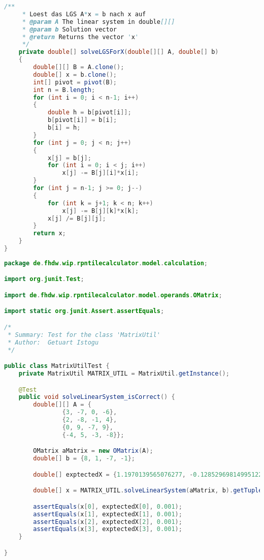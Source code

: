 \begin{lstlisting}[caption=MatrixUtil (Istogu),label=list:MatrixUtil,language=Java]
    /**
     * Loest das LGS A*x = b nach x auf
     * @param A The linear system in double[][]
     * @param b Solution vector
     * @return Returns the vector 'x'
     */
    private double[] solveLGSForX(double[][] A, double[] b)
    {
        double[][] B = A.clone();
        double[] x = b.clone();
        int[] pivot = pivot(B);
        int n = B.length;
        for (int i = 0; i < n-1; i++)
        {
            double h = b[pivot[i]];
            b[pivot[i]] = b[i];
            b[i] = h;
        }
        for (int j = 0; j < n; j++)
        {
            x[j] = b[j];
            for (int i = 0; i < j; i++)
                x[j] -= B[j][i]*x[i];
        }
        for (int j = n-1; j >= 0; j--)
        {
            for (int k = j+1; k < n; k++)
                x[j] -= B[j][k]*x[k];
            x[j] /= B[j][j];
        }
        return x;
    }
}
\end{lstlisting}    

\begin{lstlisting}[caption=MatrixUtilTest (Istogu), label=list:MatrixUtilTest, language=Java]
package de.fhdw.wip.rpntilecalculator.model.calculation;

import org.junit.Test;

import de.fhdw.wip.rpntilecalculator.model.operands.OMatrix;

import static org.junit.Assert.assertEquals;

/*
 * Summary: Test for the class 'MatrixUtil'
 * Author:  Getuart Istogu
 */

public class MatrixUtilTest {
    private MatrixUtil MATRIX_UTIL = MatrixUtil.getInstance();

    @Test
    public void solveLinearSystem_isCorrect() {
        double[][] A = {
                {3, -7, 0, -6},
                {2, -8, -1, 4},
                {0, 9, -7, 9},
                {-4, 5, -3, -8}};

        OMatrix aMatrix = new OMatrix(A);
        double[] b = {8, 1, -7, -1};

        double[] exptectedX = {1.1970139565076277, -0.12852969814995122, 0.08276533592989294, -0.5848750405712432};

        double[] x = MATRIX_UTIL.solveLinearSystem(aMatrix, b).getTuple();

        assertEquals(x[0], exptectedX[0], 0.001);
        assertEquals(x[1], exptectedX[1], 0.001);
        assertEquals(x[2], exptectedX[2], 0.001);
        assertEquals(x[3], exptectedX[3], 0.001);
    }

}
\end{lstlisting}

